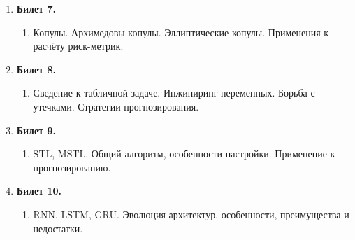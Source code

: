 \documentclass[12pt]{article}
\begin{document}
\begin{enumerate}
    \item \textbf{Билет 7.}
    \begin{enumerate}
        \item Копулы. Архимедовы копулы. Эллиптические копулы. Применения к расчёту риск-метрик.
    \end{enumerate}

    \item \textbf{Билет 8.}
    \begin{enumerate}
        \item Сведение к табличной задаче. Инжиниринг переменных. Борьба с утечками. Стратегии прогнозирования.
    \end{enumerate}

    \item \textbf{Билет 9.}
    \begin{enumerate}
        \item STL, MSTL. Общий алгоритм, особенности настройки. Применение к прогнозированию.
    \end{enumerate}

    \item \textbf{Билет 10.}
    \begin{enumerate}
        \item RNN, LSTM, GRU. Эволюция архитектур, особенности, преимущества и недостатки.
    \end{enumerate}

\end{enumerate}
\end{document}
